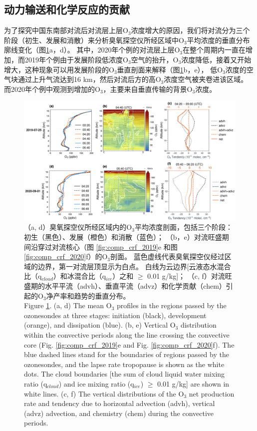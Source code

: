\subsection{动力输送和化学反应的贡献} \label{sec:convec_impacts}

为了探究中国东南部对流后对流层上层O$_3$浓度增大的原因，我们将对流分为三个阶段（初生、发展和消散）来分析臭氧探空仪所经区域中O$_3$平均浓度的垂直分布廓线变化（图\ref{fig:tendency_o3}a，d）。
其中，2020年个例的对流层上层O$_3$在整个周期内一直在增加，而2019年个例由于发展阶段低浓度O$_3$空气的抬升，O$_3$浓度降低，接着又开始增大，这种现象可以用发展阶段的O$_3$垂直剖面来解释（图\ref{fig:tendency_o3}b，e），
低O$_3$浓度的空气块通过上升气流达到16 km，然后对流后方的高O$_3$浓度空气被夹卷进该区域。
而2020年个例中观测到增加的O$_3$，主要来自垂直传输的背景O$_3$浓度。

\begin{figure}[H]
\centering
\includegraphics[width=\textwidth]{./figures/tendency_o3.png}
\caption{
（a, d）臭氧探空仪所经区域内的O$_3$平均浓度剖面，包括三个阶段：初生（黑色）、发展（橙色）和消散（蓝色）；
（b，e）对流旺盛期间沿穿过对流核心（图 \ref{fig:comp_crf_2019}e 和图 \ref{fig:comp_crf_2020}f）的O$_3$剖面。
蓝色虚线代表臭氧探空仪经过区域的边界，第一对流层顶显示为白点。
白线为云边界[云液态水混合比（q$_{cloud}$）和冰混合比（q$_{ice}$）之和 $\geq$ 0.01 g/kg]；
（c, f）对流旺盛期的水平平流（advh）、垂直平流（advz）和化学贡献（chem）引起的O$_3$净产率和趋势的垂直分布。
\\
Figure \ref{fig:tendency_o3}. (a, d) The mean O$_3$ profiles in the regions passed by the ozonesondes
at three stages: initiation (black), development (orange), and dissipation (blue).
(b, e) Vertical O$_3$ distribution within the convective periods along the line crossing the convective core (Fig. \ref{fig:comp_crf_2019}e and Fig. \ref{fig:comp_crf_2020}f).
The blue dashed lines stand for the boundaries of regions passed by the ozonesondes, and the lapse rate tropopause is shown as the white dots.
The cloud boundaries [the sum of cloud liquid water mixing ratio (q$_{cloud}$) and ice mixing ratio (q$_{ice}$) $\geq$ 0.01 g/kg] are shown in white lines.
(c, f) The vertical distributions of the O$_3$ net production rate and tendency due to horizontal advection (advh), vertical (advz) advection, and chemistry (chem) during the convective periods.
}
\label{fig:tendency_o3}
\end{figure}

